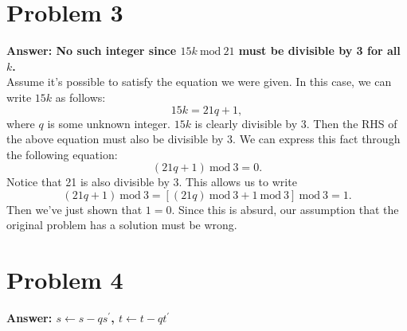 \documentclass[11pt]{article}
\newcommand{\Mod}[1]{\:\mathrm{mod}\:#1}
\begin{document}
\section*{Problem 3}
\label{sec:orgcf0e9c6}
\textbf{Answer: No such integer since \(15k\Mod 21\) must be divisible by 3 for all \(k\).}\\[0pt]

Assume it's possible to satisfy the equation we were given. In this case, we can
write \(15k\) as follows:
\begin{equation}
15k=21q+1,
\end{equation}
where \(q\) is some unknown integer. \(15k\) is clearly divisible by 3. Then the RHS
of the above equation must also be divisible by 3. We can express this fact
through the following equation:
\begin{equation}
(21q+1)\Mod 3=0.
\end{equation}
Notice that 21 is also divisible by 3. This allows us to write
\begin{equation}
(21q+1)\Mod 3=[(21q)\Mod 3+1\Mod 3]\Mod 3=1.
\end{equation}
Then we've just shown that \(1=0\). Since this is absurd, our assumption that the
original problem has a solution must be wrong.

\section*{Problem 4}
\label{sec:orgf904936}
\textbf{Answer: \(s\leftarrow s-qs^{\prime}\), \(t\leftarrow t-qt^{\prime}\)}\\[0pt]
\end{document}
